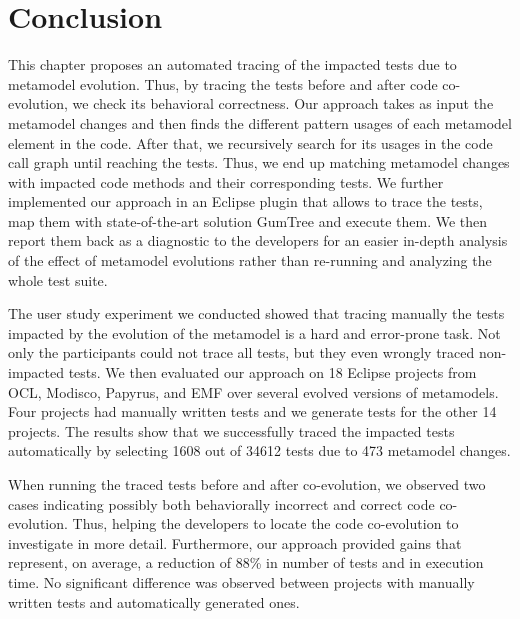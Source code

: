 \section{Conclusion}
\label{sec_conclusion}
This chapter proposes an automated tracing of the impacted tests due to metamodel evolution. Thus, by tracing the tests before and after code co-evolution, we check its behavioral correctness. 
Our approach takes as input the metamodel changes and then finds the different pattern usages of each metamodel element in the code. 
After that, we recursively search for its usages in the code call graph until reaching the tests. Thus, we end up matching metamodel changes with impacted code methods and their corresponding tests. 
%
We further implemented our approach in an Eclipse plugin that allows to trace the tests, map them with state-of-the-art solution GumTree and execute them. We then report them back as a diagnostic to the developers for an easier in-depth analysis of the effect of metamodel evolutions rather than re-running and analyzing the whole test suite.

The user study experiment we conducted showed that tracing manually the tests impacted by the evolution of the metamodel is a hard and error-prone task. Not only the participants could not trace all tests, but they even wrongly traced non-impacted tests.  
	We then evaluated our approach on 18 Eclipse projects from OCL, Modisco, Papyrus, and EMF over several evolved versions of metamodels. Four projects had manually written tests and we generate tests for the other 14 projects. 
	The results show that we successfully traced the impacted tests automatically by selecting 1608 out of 34612 tests due to 473 metamodel changes. 
	
	When running the traced tests before and after co-evolution, we observed two cases indicating possibly both behaviorally incorrect and correct code co-evolution. Thus, helping the developers to locate the code co-evolution to investigate in more detail. Furthermore, our approach provided gains that represent, on average, a reduction of 88\% in number of tests and  in execution time. No significant difference was observed between projects with manually written tests and automatically generated ones.   

